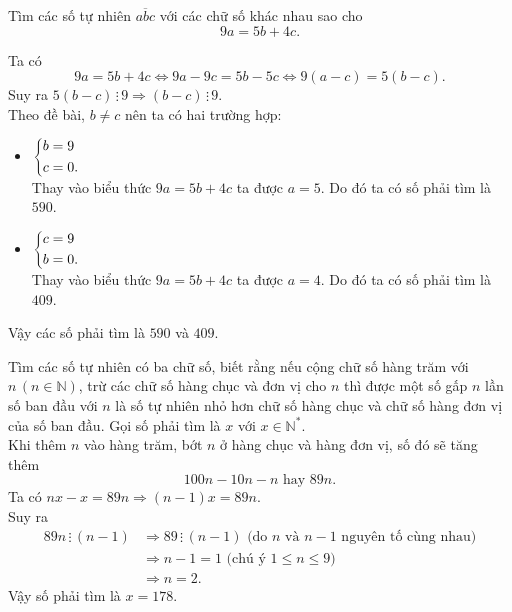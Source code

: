 \begin{bt}
 Tìm các số tự nhiên $\overline{abc}$ với các chữ số khác nhau sao cho
 $$9a = 5b + 4c.$$
 \loigiai
  {
  Ta có
  $$9a = 5b + 4c \Leftrightarrow 9a - 9c = 5b - 5c \Leftrightarrow 9(a - c) = 5(b - c).$$    
  Suy ra $5(b - c) \, \vdots \, 9 \Rightarrow (b - c) \, \vdots \, 9$.\\
  Theo đề bài, $b \neq c$ nên ta có hai trường hợp:
  \begin{itemize}
   \item $\left\{\begin{aligned}& b = 9 \\& c = 0.\end{aligned}\right.$\\
   Thay vào biểu thức $9a = 5b + 4c$ ta được $a = 5$. Do đó ta có số phải tìm là $590$.
   \item $\left\{\begin{aligned}& c = 9 \\& b = 0.\end{aligned}\right.$\\
   Thay vào biểu thức $9a = 5b + 4c$ ta được $a = 4$. Do đó ta có số phải tìm là $409$.
  \end{itemize}
  Vậy các số phải tìm là $590$ và $409$.
  }
\end{bt}


\begin{bt}
 Tìm các số tự nhiên có ba chữ số, biết rằng nếu cộng chữ số hàng trăm với $n \, (n \in \mathbb{N})$, trừ các chữ số hàng chục và đơn vị cho $n$ thì được một số gấp $n$ lần số ban đầu với $n$ là số tự nhiên nhỏ hơn chữ số hàng chục và chữ số hàng đơn vị của số ban đầu.
 \loigiai
  {
  Gọi số phải tìm là $x$ với $x \in \mathbb{N^*}$.\\
  Khi thêm $n$ vào hàng trăm, bớt $n$ ở hàng chục và hàng đơn vị, số đó sẽ tăng thêm
  $$100n - 10n - n \text{ hay } 89n.$$
  Ta có $nx - x = 89n \Rightarrow (n - 1)x = 89n$.\\
  Suy ra
  \begin{align*}
   89n \, \vdots \, (n - 1) & \Rightarrow 89 \, \vdots \, (n - 1) \text{ (do $n$ và $n - 1$ nguyên tố cùng nhau)}\\
   & \Rightarrow n - 1 = 1 \text{ (chú ý $1 \leq n \leq 9$)}\\
   & \Rightarrow n = 2.
  \end{align*}
  Vậy số phải tìm là $x = 178$.
  }
\end{bt}


